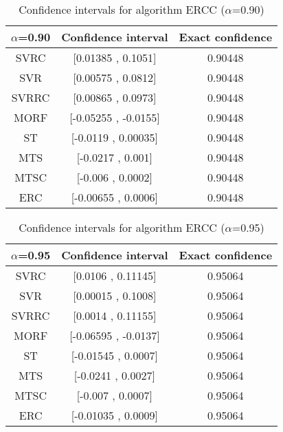 \documentclass[a4paper,10pt]{article}
\begin{document}
\begin{table}[!htp]
\centering\small
\begin{tabular}{
|c|c|c|}
\hline
 $\alpha$=0.90 & Confidence interval & Exact confidence \\ \hline 
SVRC & [0.01385 , 0.1051] & 0.90448\\ \hline 
SVR & [0.00575 , 0.0812] & 0.90448\\ \hline 
SVRRC & [0.00865 , 0.0973] & 0.90448\\ \hline 
MORF & [-0.05255 , -0.0155] & 0.90448\\ \hline 
ST & [-0.0119 , 0.00035] & 0.90448\\ \hline 
MTS & [-0.0217 , 0.001] & 0.90448\\ \hline 
MTSC & [-0.006 , 0.0002] & 0.90448\\ \hline 
ERC & [-0.00655 , 0.0006] & 0.90448\\ \hline 

\end{tabular}
\caption{Confidence intervals for algorithm ERCC ($\alpha$=0.90)}
\end{table}
\begin{table}[!htp]
\centering\small
\begin{tabular}{
|c|c|c|}
\hline
 $\alpha$=0.95 & Confidence interval & Exact confidence \\ \hline 
SVRC & [0.0106 , 0.11145] & 0.95064\\ \hline 
SVR & [0.00015 , 0.1008] & 0.95064\\ \hline 
SVRRC & [0.0014 , 0.11155] & 0.95064\\ \hline 
MORF & [-0.06595 , -0.0137] & 0.95064\\ \hline 
ST & [-0.01545 , 0.0007] & 0.95064\\ \hline 
MTS & [-0.0241 , 0.0027] & 0.95064\\ \hline 
MTSC & [-0.007 , 0.0007] & 0.95064\\ \hline 
ERC & [-0.01035 , 0.0009] & 0.95064\\ \hline 

\end{tabular}
\caption{Confidence intervals for algorithm ERCC ($\alpha$=0.95)}
\end{table}

 \clearpage 
\end{document}
